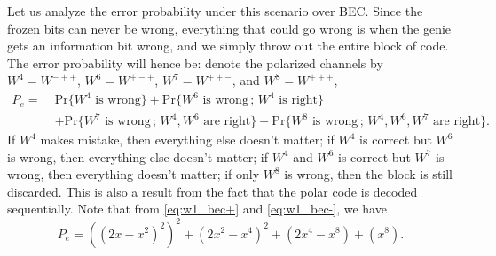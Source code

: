Let us analyze the error probability under this scenario over BEC. Since the frozen bits can never be wrong, everything that could go wrong is when the genie gets an information bit wrong, and we simply throw out the entire block of code. The error probability will hence be: denote the polarized channels by $W^4=W^{-++}$, $W^6=W^{+-+}$, $W^7=W^{++-}$, and $W^8=W^{+++}$,
\begin{equation*}\begin{aligned}
    P_e =\; &\mathrm{Pr}\{W^{4}\text{ is wrong}\} + \mathrm{Pr}\{W^{6}\text{ is wrong}\,;\,W^{4}\text{ is right}\} \\&+ \mathrm{Pr}\{W^{7}\text{ is wrong}\,;\,W^{4},W^{6}\text{ are right}\} + \mathrm{Pr}\{W^{8}\text{ is wrong}\,;\,W^{4},W^{6},W^{7}\text{ are right}\}.
\end{aligned}\end{equation*}
If $W^4$ makes mistake, then everything else doesn't matter; if $W^4$ is correct but $W^6$ is wrong, then everything else doesn't matter; if $W^4$ and $W^6$ is correct but $W^7$ is wrong, then everything doesn't matter; if only $W^8$ is wrong, then the block is still discarded. This is also a result from the fact that the polar code is decoded sequentially. Note that from \autoref{eq:w1_bec+} and \autoref{eq:w1_bec-}, we have
\begin{equation*}
    P_e = \left((2x-x^2)^2\right)^2 + (2x^2-x^4)^2 + (2x^4-x^8) + (x^8).
\end{equation*}

